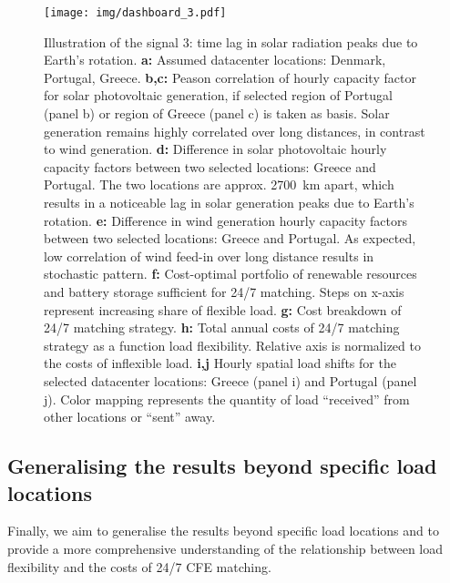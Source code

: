 \begin{figure}
    \centering
    \texttt{[image: img/dashboard\_3.pdf]}
    \caption{Illustration of the signal 3: time lag in solar radiation peaks due to Earth's rotation.
    \textbf{a:} Assumed datacenter locations: Denmark, Portugal, Greece.
    \textbf{b,c:} Peason correlation of hourly capacity factor for solar photovoltaic generation, if selected region of Portugal (panel b) or region of Greece (panel c) is taken as basis. Solar generation remains highly correlated over long distances, in contrast to wind generation.
    \textbf{d:} Difference in solar photovoltaic hourly capacity factors between two selected locations: Greece and Portugal. The two locations are approx. 2700~km apart, which results in a noticeable lag in solar generation peaks due to Earth's rotation.
    \textbf{e:} Difference in wind generation hourly capacity factors between two selected locations: Greece and Portugal. As expected, low correlation of wind feed-in over long distance results in stochastic pattern.
    \textbf{f:} Cost-optimal portfolio of renewable resources and battery storage sufficient for 24/7 matching. Steps on x-axis represent increasing share of flexible load.
    \textbf{g:} Cost breakdown of 24/7 matching strategy.
    \textbf{h:} Total annual costs of 24/7 matching strategy as a function load flexibility. Relative axis is normalized to the costs of inflexible load.
    \textbf{i,j} Hourly spatial load shifts for the selected datacenter locations: Greece (panel i) and Portugal (panel j). Color mapping represents the quantity of load \enquote{received} from other locations or \enquote{sent} away.}
    \label{fig:dashboard3}
\end{figure}


\subsection{Generalising the results beyond specific load locations}
\label{ssec:section4}

Finally, we aim to generalise the results beyond specific load locations and to provide a more comprehensive understanding of the relationship between load flexibility and the costs of 24/7 CFE matching.

